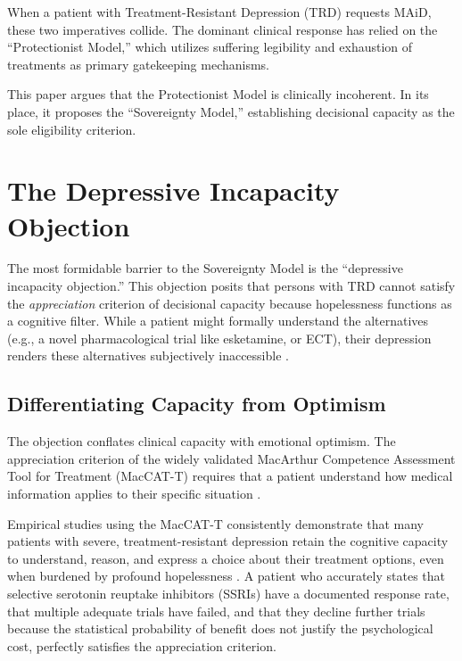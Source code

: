 \documentclass[10pt, twocolumn, letterpaper]{article}
\begin{document}
When a patient with Treatment-Resistant Depression (TRD) requests MAiD, these two imperatives collide. The dominant clinical response has relied on the ``Protectionist Model,'' which utilizes suffering legibility and exhaustion of treatments as primary gatekeeping mechanisms. 

This paper argues that the Protectionist Model is clinically incoherent. In its place, it proposes the ``Sovereignty Model,'' establishing decisional capacity as the sole eligibility criterion.

\section{The Depressive Incapacity Objection}

The most formidable barrier to the Sovereignty Model is the ``depressive incapacity objection.'' This objection posits that persons with TRD cannot satisfy the \textit{appreciation} criterion of decisional capacity because hopelessness functions as a cognitive filter. While a patient might formally understand the alternatives (e.g., a novel pharmacological trial like esketamine, or ECT), their depression renders these alternatives subjectively inaccessible \cite{sullivan1994}.

\subsection{Differentiating Capacity from Optimism}

The objection conflates clinical capacity with emotional optimism. The appreciation criterion of the widely validated MacArthur Competence Assessment Tool for Treatment (MacCAT-T) requires that a patient understand how medical information applies to their specific situation \cite{appelbaum1995}. 

Empirical studies using the MacCAT-T consistently demonstrate that many patients with severe, treatment-resistant depression retain the cognitive capacity to understand, reason, and express a choice about their treatment options, even when burdened by profound hopelessness \cite{hindmarch2013, vollmann2003}. A patient who accurately states that selective serotonin reuptake inhibitors (SSRIs) have a documented response rate, that multiple adequate trials have failed, and that they decline further trials because the statistical probability of benefit does not justify the psychological cost, perfectly satisfies the appreciation criterion.
\end{document}
